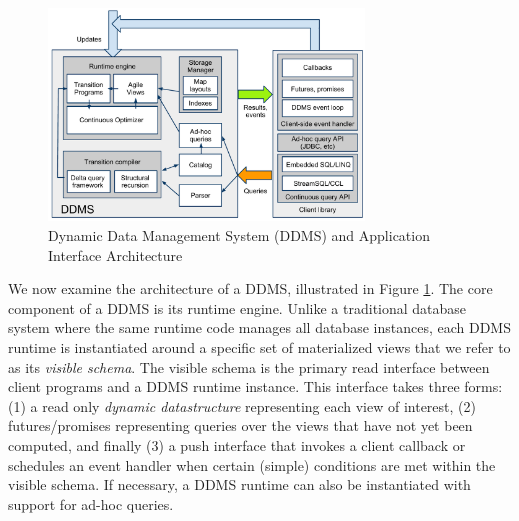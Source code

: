 
\begin{figure}
\begin{center}
\includegraphics[width=3.3in]{graphics/CIDRarch.pdf}
\end{center}
\vspace*{-0.2in}
\caption{Dynamic Data Management System (DDMS) and Application Interface
Architecture}
\label{fig:ddmsarch}
\vspace*{-0.2in}
\end{figure}

We now examine the architecture of a DDMS, illustrated in Figure \ref{fig:ddmsarch}.  The core component of a DDMS is its runtime engine.  Unlike a traditional database system where the same runtime code manages all database instances, each DDMS runtime is instantiated around a specific set of materialized views that we refer to as its \textit{visible schema}.  The visible schema is the primary read interface between client programs and a DDMS runtime instance.  This interface takes three forms: (1) a read only \textit{dynamic datastructure} representing each view of interest, (2) futures/promises representing queries over the views that have not yet been computed, and finally (3) a push interface that invokes a client callback or schedules an event handler when certain (simple) conditions are met within the visible schema.  If necessary, a DDMS runtime can also be instantiated with support for ad-hoc queries.

